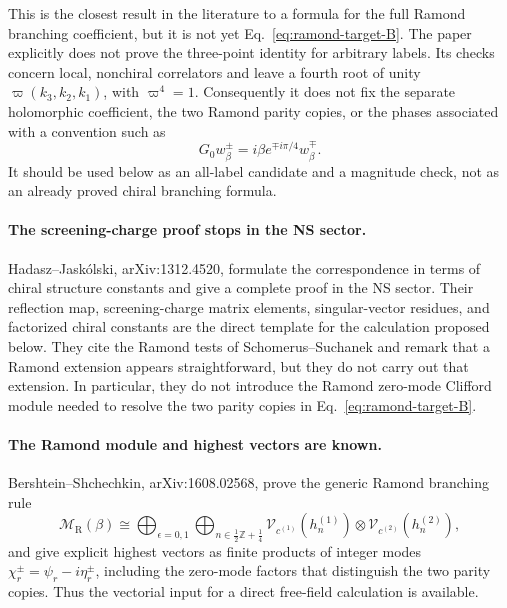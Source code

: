 \documentclass[11pt]{article}
\newcommand{\V}{\mathcal V}
\newcommand{\M}{\mathcal M}
\begin{document}
This is the closest result in the literature to a formula for the full
Ramond branching coefficient, but it is not yet Eq.~\eqref{eq:ramond-target-B}.
The paper explicitly does not prove the three-point identity for arbitrary
labels.  Its checks concern local, nonchiral correlators and leave a fourth
root of unity \(\varpi(k_3,k_2,k_1)\), with \(\varpi^4=1\).  Consequently it
does not fix the separate holomorphic coefficient, the two Ramond parity
copies, or the phases associated with a convention such as
\begin{equation}
 G_0w_\beta^\pm=i\beta e^{\mp i\pi/4}w_\beta^\mp.
 \label{eq:ramond-G0-phase-status}
\end{equation}
It should be used below as an all-label candidate and a magnitude check, not
as an already proved chiral branching formula.

\paragraph{The screening-charge proof stops in the NS sector.}
Hadasz--Jask\'olski, arXiv:1312.4520, formulate the correspondence in terms
of chiral structure constants and give a complete proof in the NS sector.
Their reflection map, screening-charge matrix elements, singular-vector
residues, and factorized chiral constants are the direct template for the
calculation proposed below.  They cite the Ramond tests of
Schomerus--Suchanek and remark that a Ramond extension appears
straightforward, but they do not carry out that extension.  In particular,
they do not introduce the Ramond zero-mode Clifford module needed to resolve
the two parity copies in Eq.~\eqref{eq:ramond-target-B}.

\paragraph{The Ramond module and highest vectors are known.}
Bershtein--Shchechkin, arXiv:1608.02568, prove the generic Ramond branching
rule
\begin{equation}
 \M_{\mathrm R}(\beta)
 \cong
 \bigoplus_{\epsilon=0,1}
 \bigoplus_{n\in\frac12\mathbb Z+\frac14}
 \V_{c^{(1)}}(h_n^{(1)})\otimes
 \V_{c^{(2)}}(h_n^{(2)}),
 \label{eq:ramond-literature-branching}
\end{equation}
and give explicit highest vectors as finite products of integer modes
\(\chi_r^\pm=\psi_r-i\eta_r^\pm\), including the zero-mode factors that
distinguish the two parity copies.  Thus the vectorial input for a direct
free-field calculation is available.
\end{document}
